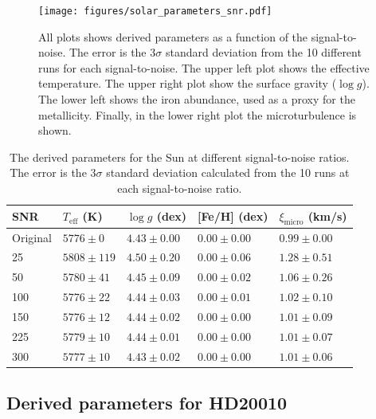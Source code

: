 \documentclass{aa}
\begin{document}
\begin{figure}[tbp!]
    \centering
    \texttt{[image: figures/solar\_parameters\_snr.pdf]}
    \caption{All plots shows derived parameters as a function of the
    signal-to-noise. The error is the 3$\sigma$ standard deviation from
    the 10 different runs for each signal-to-noise. The upper left plot
    shows the effective temperature. The upper right plot show the
    surface gravity ($\log g$). The lower left shows the iron abundance,
    used as a proxy for the metallicity. Finally, in the lower right
    plot the microturbulence is shown.}
    \label{fig:snr_sun}
\end{figure}

\begin{table}[htb!]
    \caption{The derived parameters for the Sun at different
    signal-to-noise ratios. The error is the 3$\sigma$ standard
    deviation calculated from the 10 runs at each signal-to-noise
    ratio.}
    \label{tab:solar_params}
    \centering
    \begin{tabular}{lllll}
      \hline\hline
        SNR & $T_\mathrm{eff}$ (K) & $\log g$ (dex)  &  [Fe/H] (dex)    & $\xi_\mathrm{micro}$ (km/s)  \\
      \hline
  Original  &  $5776 \pm 0$        & $4.43 \pm 0.00$ & $0.00 \pm 0.00$  & $0.99 \pm 0.00$              \\
      \hline
        25  &  $5808 \pm 119$      & $4.50 \pm 0.20$ & $0.00 \pm 0.06$  & $1.28 \pm 0.51$              \\
        50  &  $5780 \pm 41$       & $4.45 \pm 0.09$ & $0.00 \pm 0.02$  & $1.06 \pm 0.26$              \\
       100  &  $5776 \pm 22$       & $4.44 \pm 0.03$ & $0.00 \pm 0.01$  & $1.02 \pm 0.10$              \\
       150  &  $5776 \pm 12$       & $4.44 \pm 0.02$ & $0.00 \pm 0.00$  & $1.01 \pm 0.09$              \\
       225  &  $5779 \pm 10$       & $4.44 \pm 0.01$ & $0.00 \pm 0.00$  & $1.01 \pm 0.07$              \\
       300  &  $5777 \pm 10$       & $4.43 \pm 0.02$ & $0.00 \pm 0.00$  & $1.01 \pm 0.06$              \\
      \hline
    \end{tabular}
\end{table}



\subsection{Derived parameters for HD20010}
\label{sec:derived_parameters_of_hd20010}
\end{document}
